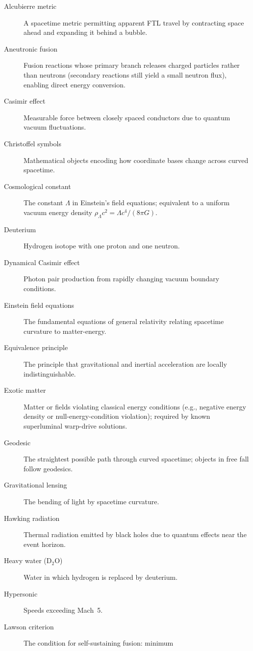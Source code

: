 \documentclass[aps,prd,twocolumn,superscriptaddress,nofootinbib,floatfix]{revtex4-2}
\begin{document}
\begin{description}
  \item[Alcubierre metric] A spacetime metric permitting apparent FTL travel by
    contracting space ahead and expanding it behind a bubble.
  \item[Aneutronic fusion] Fusion reactions whose primary branch releases
    charged particles rather than neutrons (secondary reactions still yield a
    small neutron flux), enabling direct energy conversion.
  \item[Casimir effect] Measurable force between closely spaced conductors due
    to quantum vacuum fluctuations.
  \item[Christoffel symbols] Mathematical objects encoding how coordinate bases
    change across curved spacetime.
  \item[Cosmological constant] The constant $\Lambda$ in Einstein's field
    equations; equivalent to a uniform vacuum energy density
    $\rho_{\Lambda}c^{2}=\Lambda c^{4}/(8\pi G)$.
  \item[Deuterium] Hydrogen isotope with one proton and one neutron.
  \item[Dynamical Casimir effect] Photon pair production from rapidly changing
    vacuum boundary conditions.
  \item[Einstein field equations] The fundamental equations of general relativity
    relating spacetime curvature to matter-energy.
  \item[Equivalence principle] The principle that gravitational and inertial
    acceleration are locally indistinguishable.
  \item[Exotic matter] Matter or fields violating classical energy conditions
    (e.g., negative energy density or null-energy-condition violation); required
    by known superluminal warp-drive solutions.
  \item[Geodesic] The straightest possible path through curved spacetime; objects
    in free fall follow geodesics.
  \item[Gravitational lensing] The bending of light by spacetime curvature.
  \item[Hawking radiation] Thermal radiation emitted by black holes due to
    quantum effects near the event horizon.
  \item[Heavy water (D$_{2}$O)] Water in which hydrogen is replaced by deuterium.
  \item[Hypersonic] Speeds exceeding Mach~5.
  \item[Lawson criterion] The condition for self-sustaining fusion: minimum

\end{description}
\end{document}
